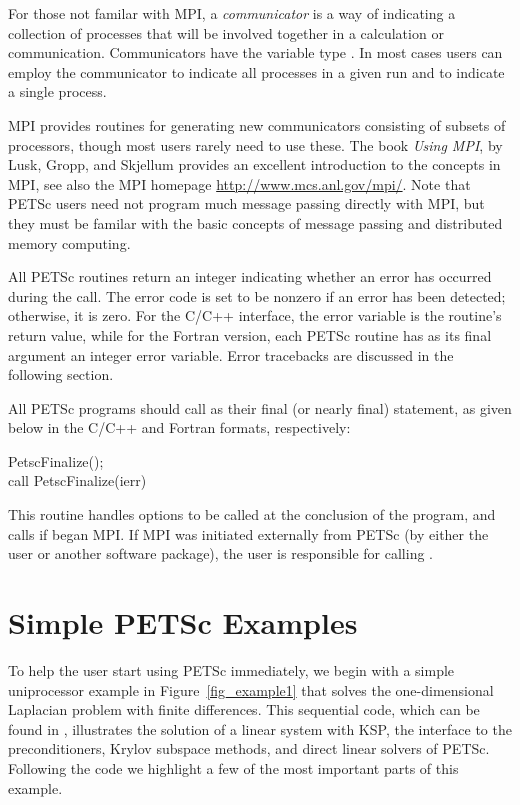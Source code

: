 For those not familar with MPI, a {\em communicator} is a way of
indicating a collection of processes that will be involved together
in a calculation or communication. Communicators have the variable type
. In most cases users can employ the communicator  to indicate all processes in a given run and  to indicate a single process.

MPI provides routines
for generating new communicators consisting of subsets of processors,
though most users rarely need to use these. The book {\em Using MPI},
by Lusk, Gropp, and Skjellum \cite{using-mpi} provides an excellent
introduction to the concepts in MPI, see also the MPI homepage 
\href{http://www.mcs.anl.gov/mpi/}{http://www.mcs.anl.gov/mpi/}.
Note that PETSc users need not program much message passing directly
with MPI, but they must be familar with the basic concepts of message
passing and distributed memory computing.

All PETSc routines return an integer indicating whether an error has
occurred during the call.  The error code is set to be nonzero if an
error has been detected; otherwise, it is zero.  For the C/C++
interface, the error variable is the routine's return value, while for
the Fortran version, each PETSc routine has as its final argument an
integer error variable.  Error tracebacks are discussed in the following
section.

All PETSc programs should call  
as their final (or nearly final) statement, as given below in the C/C++
and Fortran formats, respectively:
\begin{tabbing}
  PetscFinalize();\\
  call PetscFinalize(ierr)
\end{tabbing}
This routine handles options to be called at the conclusion of
the program, and calls  
if 
began MPI. If MPI was initiated externally from PETSc (by either
the user or another software package), the user is
responsible for calling . 

\section{Simple PETSc Examples}

\label{sec_simple}

To help the user start using PETSc immediately, we begin with a simple
uniprocessor example in Figure~\ref{fig_example1} that solves the
one-dimensional Laplacian problem with finite differences.  This
sequential code, which can be found in 
,
illustrates the solution of a linear system with KSP, the 
interface to the preconditioners, Krylov subspace methods, and direct
linear solvers of PETSc.  Following the code we highlight a few of the most important
parts of this example.  

